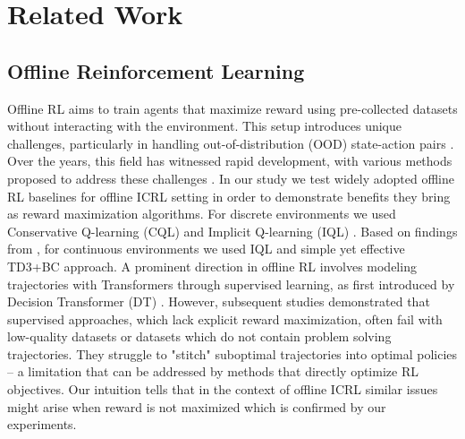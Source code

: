 \documentclass{article}
\begin{document}
\section{Related Work}
\label{related}
\subsection{Offline Reinforcement Learning}
Offline RL aims to train agents that maximize reward using pre-collected datasets without interacting with the environment. This setup introduces unique challenges, particularly in handling out-of-distribution (OOD) state-action pairs \citep{levine2020offline}. Over the years, this field has witnessed rapid development, with various methods proposed to address these challenges \citep{kumar2020conservative, an2021uncertainty, kostrikov2021offline, fujimoto2021minimalist}. In our study we test widely adopted offline RL baselines for offline ICRL setting in order to demonstrate benefits they bring as reward maximization algorithms. For discrete environments we used Conservative Q-learning (CQL) \citep{kumar2020conservative} and Implicit Q-learning (IQL) \citep{kostrikov2021offline}. Based on findings from \citet{tarasov2024corl}, for continuous environments we used IQL and simple yet effective \citep{tarasov2024revisiting} TD3+BC \citep{fujimoto2021minimalist} approach.
A prominent direction in offline RL involves modeling trajectories with Transformers through supervised learning, as first introduced by Decision Transformer (DT) \citep{chen2021decision}. However, subsequent studies \citep{yamagata2023q, hu2024q, zhuang2024reinformer} demonstrated that supervised approaches, which lack explicit reward maximization, often fail with low-quality datasets or datasets which do not contain problem solving trajectories. They struggle to "stitch" suboptimal trajectories into optimal policies -- a limitation that can be addressed by methods that directly optimize RL objectives. Our intuition tells that in the context of offline ICRL similar issues might arise when reward is not maximized which is confirmed by our experiments.
\end{document}
